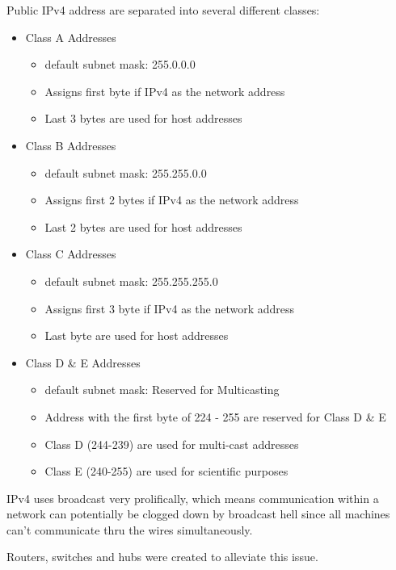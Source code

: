 \documentclass[fancy,11pt,titlestyle=display]{style/elegantbook}
\begin{document}
Public IPv4 address are separated into several different classes:
\begin{itemize}
    \item Class A Addresses
    \begin{itemize}
        \item default subnet mask: 255.0.0.0
        \item Assigns first byte if IPv4 as the network address
        \item Last 3 bytes are used for host addresses
    \end{itemize}
    \item Class B Addresses
    \begin{itemize}
        \item default subnet mask: 255.255.0.0
        \item Assigns first 2 bytes if IPv4 as the network address
        \item Last 2 bytes are used for host addresses
    \end{itemize}
    \item Class C Addresses
    \begin{itemize}
        \item default subnet mask: 255.255.255.0
        \item Assigns first 3 byte if IPv4 as the network address
        \item Last byte are used for host addresses
    \end{itemize}
    \item Class D \& E Addresses
    \begin{itemize}
        \item default subnet mask: Reserved for Multicasting
        \item Address with the first byte of 224 - 255 are reserved for Class D \& E
        \item Class D (244-239) are used for multi-cast addresses
        \item Class E (240-255) are used for scientific purposes
    \end{itemize}
\end{itemize}

IPv4 uses broadcast very prolifically, which means communication within a network can potentially be clogged down by broadcast hell since all machines can't communicate thru the wires simultaneously.

Routers, switches and hubs were created to alleviate this issue.
\end{document}

